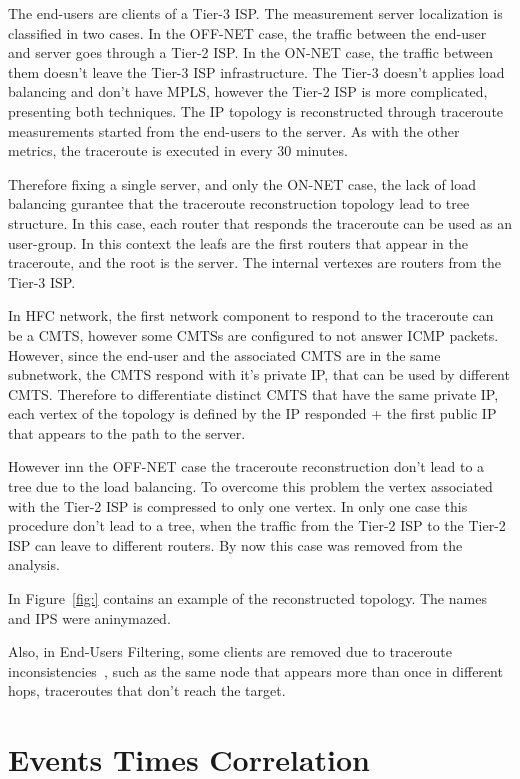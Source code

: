 The end-users are clients of a Tier-3 ISP\@. The measurement server localization
is classified in two cases. In the OFF-NET case, the traffic between the
end-user and server goes through a Tier-2 ISP\@. In the ON-NET case, the traffic
between them doesn't leave the Tier-3 ISP infrastructure. The Tier-3 doesn't
applies load balancing and don't have MPLS, however the Tier-2 ISP is more
complicated, presenting both techniques. The IP topology is reconstructed
through traceroute measurements started from the end-users to the server. As
with the other metrics, the traceroute is executed in every 30 minutes.

Therefore fixing a single server, and only the ON-NET case, the lack of load
balancing gurantee that the traceroute
reconstruction topology lead to tree structure. In this case, each router that
responds the traceroute can be used as an user-group. In this context the leafs
are the first routers that appear in the traceroute, and the root is the
server. The internal vertexes are routers from the Tier-3 ISP\@.

In HFC network, the first network component to respond to the traceroute can be
a CMTS, however some CMTSs are configured to not answer ICMP packets. However,
since the end-user and the associated CMTS are in the same subnetwork, the CMTS
respond with it's private IP, that can be used by different CMTS\@. Therefore to
differentiate distinct CMTS that have the same private IP, each vertex of the
topology is defined by the IP responded + the first public IP that appears to
the path to the server.

However inn the OFF-NET case the traceroute reconstruction don't lead to a
tree due to the load balancing. To overcome this problem the vertex associated
with the Tier-2 ISP is compressed to only one vertex. In only one case this
procedure don't lead to a tree, when the traffic from the Tier-2 ISP to the
Tier-2 ISP can leave to different routers. By now this case was removed from
the analysis.

In Figure~\ref{fig:} contains an example of the reconstructed
topology. The names and IPS were aninymazed.

Also, in End-Users Filtering, some clients are removed due to traceroute
inconsistencies~\cite{avoiding_traceroute_anomalies_with_paris_traceroute},
such as the same node that appears more than once in different
hops, traceroutes that don't reach the target.

\section{Events Times Correlation}
\label{sec:events_times_correlation}

